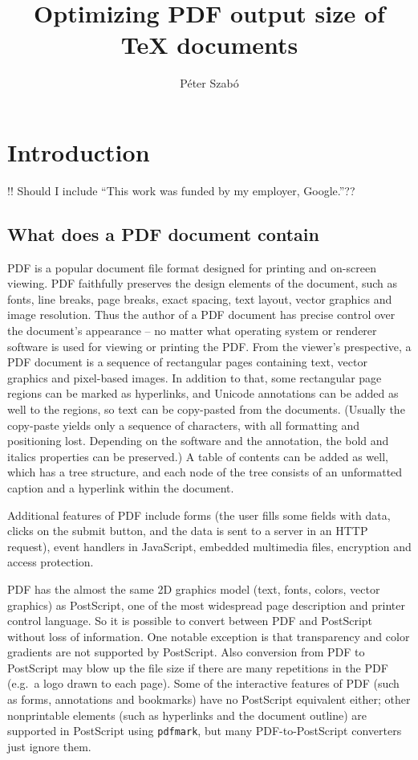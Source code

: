 \documentclass{ltugproc}
\title{Optimizing PDF output size of \TeX{} documents}
\author{P\'eter Szab\'o}
\begin{document}
\maketitle

\section{Introduction}

!! Should I include ``This work was funded by my employer, Google.''??

\subsection{What does a PDF document contain}

PDF is a popular document file format designed for printing and on-screen
viewing. PDF faithfully preserves the design elements of the document, such
as fonts, line breaks, page breaks, exact spacing, text layout, vector
graphics and image resolution. Thus the author of a PDF document has precise
control over the document's appearance -- no matter what operating system or
renderer software is used for viewing or printing the PDF. From the viewer's
prespective, a PDF document is a sequence of rectangular pages containing
text, vector graphics and pixel-based images. In addition to that, some
rectangular page regions can be marked as hyperlinks, and Unicode
annotations can be added as well to the regions, so text can be copy-pasted
from the documents. (Usually the copy-paste yields only a sequence of
characters, with all formatting and positioning lost. Depending on the
software and the annotation, the bold and italics properties can be
preserved.) A table of contents can be added as well, which has a tree
structure, and each node of the tree consists of an unformatted caption and
a hyperlink within the document.

Additional features of PDF include forms (the user fills some fields with
data, clicks on the submit button, and the data is sent to a server in an
HTTP request), event handlers in JavaScript, embedded multimedia files,
encryption and access protection.

PDF has the almost the same 2D graphics model (text, fonts, colors, vector
graphics) as PostScript, one of the most widespread page description and
printer control language. So it is possible to convert between PDF and
PostScript without loss of information. One notable exception is that
transparency and color gradients are not supported by PostScript. Also
conversion from PDF to PostScript may blow up the file size if there are
many repetitions in the PDF (e.g.\ a logo drawn to each page). Some of the
interactive features of PDF (such as forms, annotations and bookmarks) have
no PostScript equivalent either; other nonprintable elements (such as
hyperlinks and the document outline) are supported in PostScript using
\texttt{pdfmark}, but many PDF-to-PostScript converters just ignore them.
\end{document}
